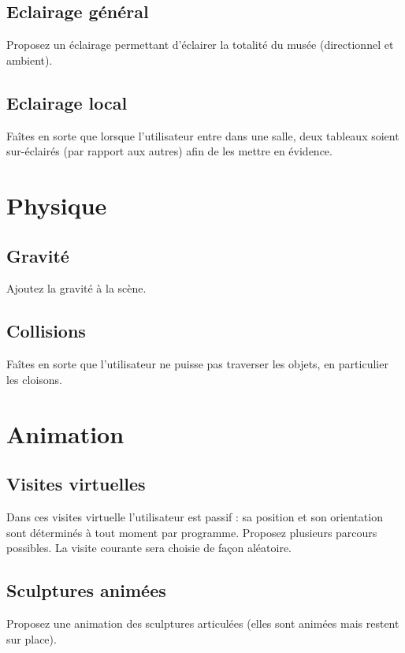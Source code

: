 \documentclass[10pt,a4paper]{article}
\begin{document}
	\subsection{Eclairage général}
	Proposez un éclairage permettant d'éclairer la totalité du musée (directionnel et ambient).
	
	\subsection{Eclairage local}
	Faîtes en sorte que lorsque l'utilisateur entre dans une salle, deux tableaux soient sur-éclairés (par rapport aux autres) afin de les mettre en évidence.
	
	\section{Physique}
	
	\subsection{Gravité}
	Ajoutez la gravité à la scène.
	
	\subsection{Collisions}
	Faîtes en sorte que l'utilisateur ne puisse pas traverser les objets, en particulier les cloisons.
	
	
	\section{Animation}
	\subsection{Visites virtuelles}
	Dans ces visites virtuelle l'utilisateur est passif : sa position et son orientation sont déterminés à tout moment par programme. Proposez plusieurs parcours possibles. La visite courante sera choisie de façon aléatoire.
	
	\subsection{Sculptures animées}
	Proposez une animation des sculptures articulées (elles sont animées mais restent sur place).
\end{document}
